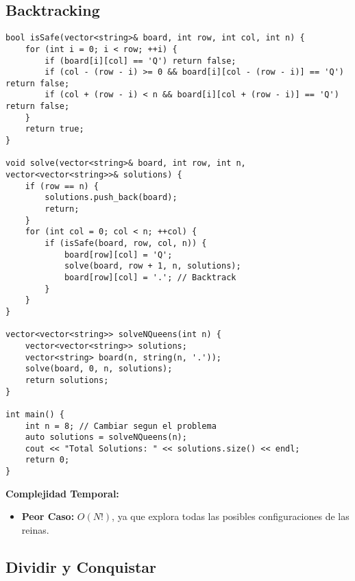     \subsection{Backtracking}
        \begin{lstlisting}[style=cpp]
bool isSafe(vector<string>& board, int row, int col, int n) {
    for (int i = 0; i < row; ++i) {
        if (board[i][col] == 'Q') return false;
        if (col - (row - i) >= 0 && board[i][col - (row - i)] == 'Q') return false;
        if (col + (row - i) < n && board[i][col + (row - i)] == 'Q') return false;
    }
    return true;
}

void solve(vector<string>& board, int row, int n, vector<vector<string>>& solutions) {
    if (row == n) {
        solutions.push_back(board);
        return;
    }
    for (int col = 0; col < n; ++col) {
        if (isSafe(board, row, col, n)) {
            board[row][col] = 'Q';
            solve(board, row + 1, n, solutions);
            board[row][col] = '.'; // Backtrack
        }
    }
}

vector<vector<string>> solveNQueens(int n) {
    vector<vector<string>> solutions;
    vector<string> board(n, string(n, '.'));
    solve(board, 0, n, solutions);
    return solutions;
}

int main() {
    int n = 8; // Cambiar segun el problema
    auto solutions = solveNQueens(n);
    cout << "Total Solutions: " << solutions.size() << endl;
    return 0;
}
    \end{lstlisting}
    \textbf{Complejidad Temporal: }
    \begin{itemize}
        \item \textbf{Peor Caso: }$O(N!)$, ya que explora todas las posibles configuraciones de las reinas.

    \end{itemize}


    \subsection{Dividir y Conquistar}
  

